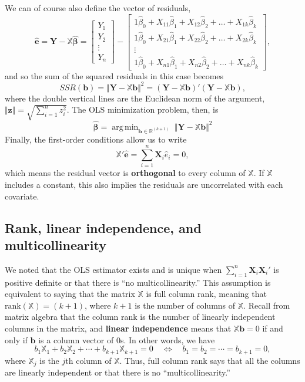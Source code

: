 \documentclass[
  13pt,
  letterpaper,
  DIV=11,
  numbers=noendperiod]{scrreprt}
\newcommand{\mb}{\bm}
\newcommand{\real}{\mathbb{R}}
\newcommand{\X}{\mb{X}}
\newcommand{\Xmat}{\mathbb{X}}
\newcommand{\bhat}{\widehat{\mb{\beta}}}
\DeclareMathOperator*{\argmin}{arg\,min}
\theoremstyle{plain}
\theoremstyle{plain}
\theoremstyle{definition}
\theoremstyle{definition}
\theoremstyle{remark}
\begin{document}
We can of course also define the vector of residuals, \[ 
 \widehat{\mb{e}} = \mb{Y} - \mathbb{X}\bhat = \left[
\begin{array}{c}
    Y_1 \\
    Y_2 \\
    \vdots \\
    Y_n
    \end{array}
\right] - 
\left[
\begin{array}{c}
   1\widehat{\beta}_0 + X_{11}\widehat{\beta}_1 + X_{12}\widehat{\beta}_2 + \dots + X_{1k}\widehat{\beta}_k \\
   1\widehat{\beta}_0 + X_{21}\widehat{\beta}_1 + X_{22}\widehat{\beta}_2 + \dots + X_{2k}\widehat{\beta}_k \\
   \vdots \\
   1\widehat{\beta}_0 + X_{n1}\widehat{\beta}_1 + X_{n2}\widehat{\beta}_2 + \dots + X_{nk}\widehat{\beta}_k
\end{array}
\right],
\] and so the sum of the squared residuals in this case becomes \[ 
SSR(\mb{b}) = \Vert\mb{Y} - \mathbb{X}\mb{b}\Vert^{2} = (\mb{Y} - \mathbb{X}\mb{b})'(\mb{Y} - \mathbb{X}\mb{b}),
\] where the double vertical lines are the Euclidean norm of the
argument, \(\Vert \mb{z} \Vert = \sqrt{\sum_{i=1}^n z_i^{2}}\). The OLS
minimization problem, then, is \[ 
\bhat = \argmin_{\mb{b} \in \real^{(k+1)}}\; \Vert\mb{Y} - \mathbb{X}\mb{b}\Vert^{2}
\] Finally, the first-order conditions allow us to write \[ 
\mathbb{X}'\widehat{\mb{e}} = \sum_{i=1}^{n} \X_{i}\widehat{e}_{i} = 0,
\] which means the residual vector is \textbf{orthogonal} to every
column of \(\Xmat\). If \(\Xmat\) includes a constant, this also implies
the residuals are uncorrelated with each covariate.

\subsection{Rank, linear independence, and
multicollinearity}\label{sec-rank}

We noted that the OLS estimator exists and is unique when
\(\sum_{i=1}^n \X_i\X_i'\) is positive definite or that there is ``no
multicollinearity.'' This assumption is equivalent to saying that the
matrix \(\mathbb{X}\) is full column rank, meaning that
\(\text{rank}(\mathbb{X}) = (k+1)\), where \(k+1\) is the number of
columns of \(\mathbb{X}\). Recall from matrix algebra that the column
rank is the number of linearly independent columns in the matrix, and
\textbf{linear independence} means that \(\mathbb{X}\mb{b} = 0\) if and
only if \(\mb{b}\) is a column vector of 0s. In other words, we have \[ 
b_{1}\mathbb{X}_{1} + b_{2}\mathbb{X}_{2} + \cdots + b_{k+1}\mathbb{X}_{k+1} = 0 \quad\iff\quad b_{1} = b_{2} = \cdots = b_{k+1} = 0, 
\] where \(\mathbb{X}_j\) is the \(j\)th column of \(\mathbb{X}\). Thus,
full column rank says that all the columns are linearly independent or
that there is no ``multicollinearity.''
\end{document}
